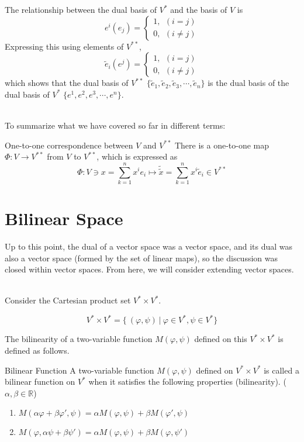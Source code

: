 \documentclass[uplatex,a4j,12pt,dvipdfmx]{jsarticle}
\begin{document}
${}$

The relationship between the dual basis of $V^{*}$ and the basis of $V$ is
\[
	e^{i}(e_{j})
	=
	\left\{
	\begin{array}{l}
		1, \ \ (i=j) \\
		0, \ \ (i \neq j)
	\end{array}
	\right.
\]
Expressing this using elements of $V^{**}$,
\[
	\tilde{e}_{i}(e^{j})
	=
	\left\{
	\begin{array}{l}
		1, \ \ (i=j) \\
		0, \ \ (i \neq j)
	\end{array}
	\right.
\]
which shows that
the dual basis of $V^{**}$
$\{ \tilde{e}_{1}, \tilde{e}_{2}, \tilde{e}_{3}, \cdots , \tilde{e}_{n} \}$
is
the dual basis of the dual basis of $V^{*}$
$\{ e^{1}, e^{2}, e^{3}, \cdots , e^{n} \}$.

\ \\

To summarize what we have covered so far in different terms:

\begin{itembox}[l]{One-to-one correspondence between $V$ and $V^{**}$}
	There is a one-to-one map $\Phi : V \to V^{**}$
	from $V$ to $V^{**}$,
	which is expressed as
	$$
		\Phi: V \ni x = \sum_{k=1}^{n} x^{i} e_{i} \mapsto \tilde{\tilde{x}} = \sum_{k=1}^{n} x^{i} \tilde{e}_{i} \in V^{**}
	$$
\end{itembox}



\section{Bilinear Space}

Up to this point, the dual of a vector space was a vector space, and its dual was also a vector space (formed by the set of linear maps), so the discussion was closed within vector spaces.
From here, we will consider extending vector spaces.

\ \\

Consider the Cartesian product set $V^{*} \times V^{*}$.

$$
	V^{*} \times V^{*}
	=
	\{
	\ (\varphi, \psi ) \ | \ \varphi \in V^{*}, \psi \in V^{*}
	\}
$$

The bilinearity of a two-variable function
$M(\varphi,\psi)$ defined on this $V^{*} \times V^{*}$ is defined as follows.


\begin{itembox}[l]{Bilinear Function}
	A two-variable function
	$M(\varphi,\psi)$
	defined on $V^{*} \times V^{*}$
	is called a bilinear function on $V^{*}$
	when it satisfies the following properties (bilinearity). ($\alpha, \beta \in \mathbb{R}$)
	\begin{enumerate}
		\item $M(\alpha \varphi + \beta \varphi', \psi) = \alpha M( \varphi, \psi) + \beta M( \varphi', \psi)$
		\item $M(\varphi, \alpha \psi + \beta \psi') = \alpha M( \varphi, \psi) + \beta M( \varphi, \psi')$
	\end{enumerate}
\end{itembox}
\end{document}
